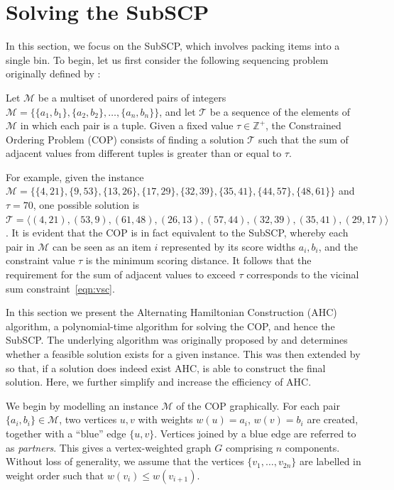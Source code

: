 \documentclass[authoryear]{elsarticle}
\begin{document}
\section{Solving the SubSCP}
\label{sec:ahc}
\noindent In this section, we focus on the SubSCP, which involves packing items into a single bin. To begin, let us first consider the following sequencing problem originally defined by \citet{hawa2018}:

\begin{definition} %
	\label{defn:cop}
	Let $\mathcal{M}$ be a multiset of unordered pairs of integers $\mathcal{M} = \{\{a_1, b_1\}, \{a_2, b_2\},\dotsc,\{a_n, b_n\}\}$, and let $\mathcal{T}$ be a sequence of the elements of $\mathcal{M}$ in which each pair is a tuple. Given a fixed value $\tau \in \mathbb{Z}^+$, the Constrained Ordering Problem (COP) consists of finding a solution $\mathcal{T}$ such that the sum of adjacent values from different tuples is greater than or equal to $\tau$.
\end{definition}

\noindent For example, given the instance $\mathcal{M} = \{\{4,21\}, \{9,53\}, \{13,26\}, \{17,29\}, \{32,39\}, \{35,41\}, \{44,57\}, \{48,61\} \}$ and $\tau = 70$, one possible solution is $\mathcal{T} = \langle(4,21), (53,9), (61,48), (26,13), (57,44), (32,39), (35,41), (29,17)\rangle$. It is evident that the COP is in fact equivalent to the SubSCP, whereby each pair in $\mathcal{M}$ can be seen as an item $i$ represented by its score widths $a_i, b_i$, and the constraint value $\tau$ is the minimum scoring distance. It follows that the requirement for the sum of adjacent values to exceed $\tau$ corresponds to the vicinal sum constraint~\eqref{eqn:vsc}.

In this section we present the Alternating Hamiltonian Construction (AHC) algorithm, a polynomial-time algorithm for solving the COP, and hence the SubSCP. The underlying algorithm was originally proposed by \citet{becker2010} and determines whether a feasible solution exists for a given instance. This was then extended by \citet{hawa2018} so that, if a solution does indeed exist AHC, is able to construct the final solution. Here, we further simplify and increase the efficiency of AHC.


We begin by modelling an instance $\mathcal{M}$ of the COP graphically. For each pair $\{a_i, b_i\} \in \mathcal{M}$, two vertices $u, v$ with weights $w(u) = a_i$, $w(v) = b_i$ are created, together with a ``blue'' edge $\{u, v\}$. Vertices joined by a blue edge are referred to as \textit{partners}. This gives a vertex-weighted graph $G$ comprising $n$ components. Without loss of generality, we assume that the vertices $\{v_1,\dotsc,v_{2n}\}$ are labelled in weight order such that $w(v_i) \leq w(v_{i+1})$.
\end{document}
